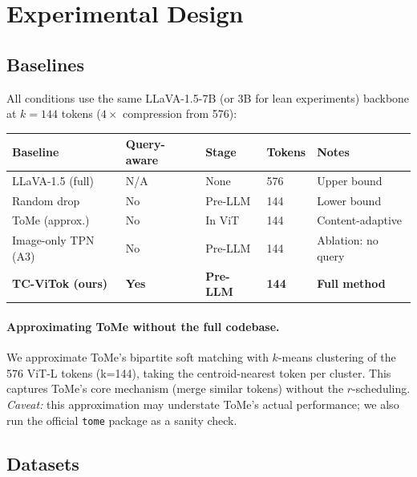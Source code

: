\documentclass[12pt,a4paper]{article}
\begin{document}
\section{Experimental Design}
\label{sec:experiments}

\subsection{Baselines}

All conditions use the same LLaVA-1.5-7B (or 3B for lean experiments) backbone
at $k = 144$ tokens ($4\times$ compression from 576):

\begin{center}
\renewcommand{\arraystretch}{1.2}
\begin{tabular}{@{}lllll@{}}
  \toprule
  Baseline & Query-aware & Stage & Tokens & Notes \\
  \midrule
  LLaVA-1.5 (full)    & N/A & None     & 576 & Upper bound \\
  Random drop         & No  & Pre-LLM  & 144 & Lower bound \\
  ToMe (approx.)      & No  & In ViT   & 144 & Content-adaptive \\
  Image-only TPN (A3) & No  & Pre-LLM  & 144 & Ablation: no query \\
  \textbf{TC-ViTok (ours)} & \textbf{Yes} & \textbf{Pre-LLM}
    & \textbf{144} & \textbf{Full method} \\
  \bottomrule
\end{tabular}
\end{center}

\paragraph{Approximating ToMe without the full codebase.}
We approximate ToMe's bipartite soft matching with $k$-means clustering of the
576 ViT-L tokens (k=144), taking the centroid-nearest token per cluster. This
captures ToMe's core mechanism (merge similar tokens) without the $r$-scheduling.
\emph{Caveat:} this approximation may understate ToMe's actual performance;
we also run the official \texttt{tome} package as a sanity check.

\subsection{Datasets}
\end{document}
